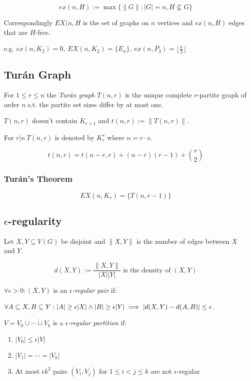 $$ex(n,H):=\max\{\|G\| : |G|=n, H \not\subseteq G\}$$

Correspondingly $EX(n,H$ is the set of graphs on $n$ vertices and $ex(n,H)$ edges that are $H$-free.

\spacing

e.g. $ex(n,K_2) = 0, \ EX(n,K_2) = \{E_n\}, \ ex(n,P_3)=\lfloor\frac{n}{2}\rfloor$

\subsection*{Tur\'{a}n Graph}

For $1 \leq r \leq n$ the \emph{Tur\'{a}n graph} $T(n,r)$ is the unique complete $r$-partite graph of order $n$ s.t. the partite set sizes differ by at most one.

$T(n,r)$ doesn't contain $K_{r+1}$ and $t(n,r) := \|T(n,r)\|$.

For $r | n \ T(n,r)$ is denoted by $K_r^s$ where $n=r \cdot s$.

$$t(n,r) = t(n-r,r)+(n-r)(r-1)+{r \choose 2}$$

\subsubsection*{Tur\'{a}n's Theorem}

$$EX(n,K_r) = \{T(n,r-1)\}$$

\subsection*{$\epsilon$-regularity}

Let $X, Y \subseteq V(G)$ be disjoint and $\|X,Y\|$ is the number of edges between $X$ and $Y$.

$$d(X,Y) := \frac{\|X,Y\|}{|X||Y|} \text{ is the density of $(X, Y)$}$$

$\forall \epsilon > 0 : (X,Y)$ is an \emph{$\epsilon$-regular pair} if:

$\forall A \subseteq X, B \subseteq Y : \\ |A| \geq \epsilon|X| \land |B| \geq \epsilon|Y| \implies |d(X,Y) - d(A,B)| \leq \epsilon$.

\spacing

$V=V_0 \dot\cup\cdots\dot\cup V_k$ is a \emph{$\epsilon$-regular partition} if:

\begin{enumerate}
	\item $|V_0| \leq \epsilon|V|$
	\item $|V_1| = \cdots = |V_k|$
	\item At most $\epsilon k^2$ pairs $(V_i,V_j)$ for $1 \leq i < j \leq k$ are not $\epsilon$-regular
\end{enumerate}

